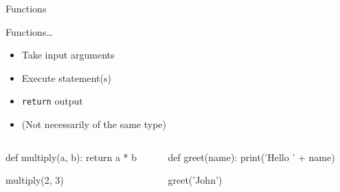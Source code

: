 \begin{frame}[fragile]{Functions}
    \begin{block}{Functions\ldots}
        \begin{itemize}
            \item Take input \alert{arguments}
            \item Execute statement(s)
            \item \texttt{return} output
            \item (Not necessarily of the same type)
        \end{itemize}
    \end{block}
    \vfill
    \begin{columns}
        \begin{column}{0.5\textwidth}
            \begin{py3}
                def multiply(a, b):
                    return a * b

                multiply(2, 3)
            \end{py3}
        \end{column}
        \begin{column}{0.5\textwidth}
            \begin{py3}
                def greet(name):
                    print('Hello ' + name)

                greet('John')
            \end{py3}
        \end{column}
    \end{columns}
\end{frame}

